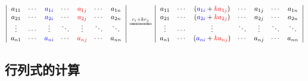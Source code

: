 $$
\left|
\begin{array}{ccccccc}
    a_{11} & \cdots & {\color{blue} a_{1i}} & \cdots & {\color{red} a_{1j}} & \cdots & a_{1n} \\
    a_{21} & \cdots & {\color{blue} a_{2i}} & \cdots & {\color{red} a_{2j}} & \cdots & a_{2n} \\
    \vdots & \cdots & \vdots & \ddots & \vdots                & \ddots & \ddots \\
    a_{n1} & \cdots & {\color{blue} a_{ni}} & \cdots & {\color{red} a_{nj}} & \cdots & a_{nn} \\
\end{array}\right|
\xlongequal{c_{i}+kc_{j}}
\left|
\begin{array}{ccccccc}
    a_{11} & \cdots & ({\color{blue} a_{1i}}+{\color{red} ka_{1j}}) & \cdots & a_{1j} & \cdots & a_{1n} \\
    a_{21} & \cdots & ({\color{blue} a_{2i}}+{\color{red} ka_{2j}}) & \cdots & a_{2j} & \cdots & a_{2n} \\
    \vdots & \cdots & \vdots                                     & \ddots & \vdots & \ddots & \ddots \\
    a_{n1} & \cdots & ({\color{blue} a_{ni}}+{\color{red} ka_{nj}}) & \cdots & a_{nj} & \cdots & a_{nn} \\
\end{array}\right|
$$
\subsection{行列式的计算}

